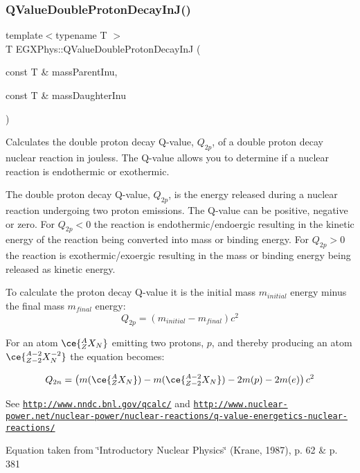 \subsubsection{\texorpdfstring{Q\+Value\+Double\+Proton\+Decay\+In\+J()}{QValueDoubleProtonDecayInJ()}}
{\footnotesize\ttfamily template$<$typename T $>$ \\
T E\+G\+X\+Phys\+::\+Q\+Value\+Double\+Proton\+Decay\+InJ (\begin{DoxyParamCaption}\item[{const T \&}]{mass\+Parent\+Inu,  }\item[{const T \&}]{mass\+Daughter\+Inu }\end{DoxyParamCaption})}



Calculates the double proton decay Q-\/value, $Q_{2p}$, of a double proton decay nuclear reaction in jouless. The Q-\/value allows you to determine if a nuclear reaction is endothermic or exothermic. 

The double proton decay Q-\/value, $Q_{2p}$, is the energy released during a nuclear reaction undergoing two proton emissions. The Q-\/value can be positive, negative or zero. For $Q_{2p} < 0$ the reaction is endothermic/endoergic resulting in the kinetic energy of the reaction being converted into mass or binding energy. For $Q_{2p} > 0$ the reaction is exothermic/exoergic resulting in the mass or binding energy being released as kinetic energy.

To calculate the proton decay Q-\/value it is the initial mass $m_{initial}$ energy minus the final mass $m_{final}$ energy\+: \[Q_{2p} = \left ( m_{initial}-m_{final}\right ) c^2\]

For an atom $\ce{ ^{A}_{Z}X_{N} }$ emitting two protons, $p$, and thereby producing an atom $\ce{ ^{A-2}_{Z-2}X^{-2}_{N} }$ the equation becomes\+:

\[Q_{2n} = \left ( m(\ce{ ^{A}_{Z}X_{N} }) - m(\ce{ ^{A-2}_{Z-2}X_{N} }) - 2m(p) - 2m(e)\right ) c^2\]

See \href{http://www.nndc.bnl.gov/qcalc/}{\tt http\+://www.\+nndc.\+bnl.\+gov/qcalc/} and \href{http://www.nuclear-power.net/nuclear-power/nuclear-reactions/q-value-energetics-nuclear-reactions/}{\tt http\+://www.\+nuclear-\/power.\+net/nuclear-\/power/nuclear-\/reactions/q-\/value-\/energetics-\/nuclear-\/reactions/}

Equation taken from \char`\"{}\+Introductory Nuclear Physics\char`\"{} (Krane, 1987), p. 62 \& p. 381


